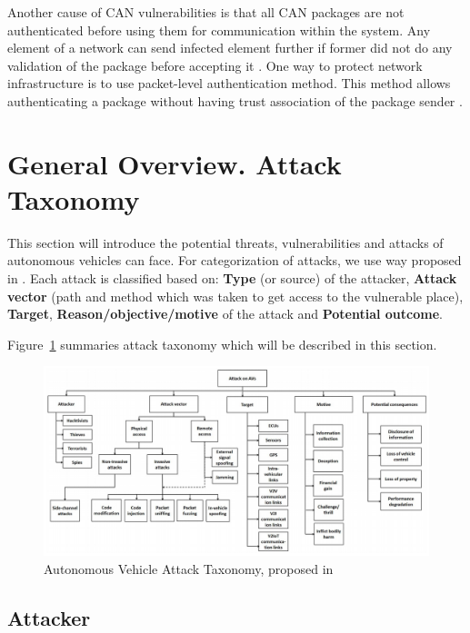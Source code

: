 \begin{enumerate}
	Another cause of \gls{CAN} vulnerabilities is that all \gls{CAN} packages are not authenticated before using them for communication within the system. Any element of a network can send infected element further if former did not do any validation of the package before accepting it \cite{secanalysis}.
	One way to protect network infrastructure is to use packet-level authentication method. This method allows authenticating a package without having trust association of the package sender \cite{pla}.
\end{enumerate}

\section{General Overview. Attack Taxonomy}

This section will introduce the potential threats, vulnerabilities
and attacks of autonomous vehicles can face. For categorization of attacks, we use way proposed in \cite{sec}. Each attack is classified based on: \textbf{Type} (or source) of the attacker, \textbf{Attack vector} (path and method which was taken to get access to the vulnerable place), \textbf{Target}, \textbf{Reason/objective/motive} of the attack and \textbf{Potential outcome}.

Figure~\ref{fig:AttackTaxonomy} summaries attack taxonomy which will be described in this section.

\begin{figure}[h]
	\centering  	
	\includegraphics[width=17cm]{img/6.jpg}
	\caption{Autonomous Vehicle Attack Taxonomy, proposed in \cite{sec}}
	\label{fig:AttackTaxonomy}    
\end{figure}

\subsection{Attacker}

